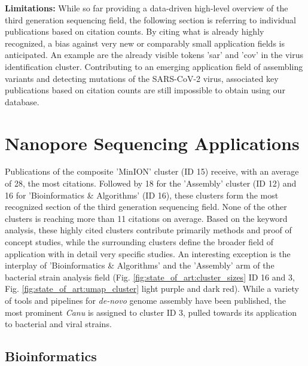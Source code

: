 \textbf{Limitations:} 
While so far providing a data-driven high-level overview of the third generation sequencing field, the following section is referring to individual publications based on citation counts.
By citing what is already highly recognized, a bias against very new or comparably small application fields is anticipated.
An example are the already visible tokens 'sar' and 'cov' in the virus identification cluster.
Contributing to an emerging application field of assembling variants and detecting mutations of the SARS-CoV-2 virus, associated key publications based on citation counts are still impossible to obtain using our database.




\section{Nanopore Sequencing Applications}
\label{sec:state_of_art:nanopore}

Publications of the composite 'MinION' cluster (ID 15) receive, with an average of 28, the most citations.
Followed by 18 for the 'Assembly' cluster (ID 12) and 16 for 'Bioinformatics \& Algorithms' (ID 16), these clusters form the most recognized section of the third generation sequencing field.
None of the other clusters is reaching more than 11 citations on average.
Based on the keyword analysis, these highly cited clusters contribute primarily methods and proof of concept studies, while the surrounding clusters define the broader field of application with in detail very specific studies.
An interesting exception is the interplay of 'Bioinformatics \& Algorithms' and the 'Assembly' arm of the bacterial strain analysis field (Fig. \ref{fig:state_of_art:cluster_sizes} ID 16 and 3, Fig. \ref{fig:state_of_art:umap_cluster} light purple and dark red).
While a variety of tools and pipelines for \textit{de-novo} genome assembly have been published, the most prominent \textit{Canu} \cite{Koren2017} is assigned to cluster ID 3, pulled towards its application to bacterial and viral strains.




\subsection{Bioinformatics}
\label{subsec:state_of_art:bioinf}

